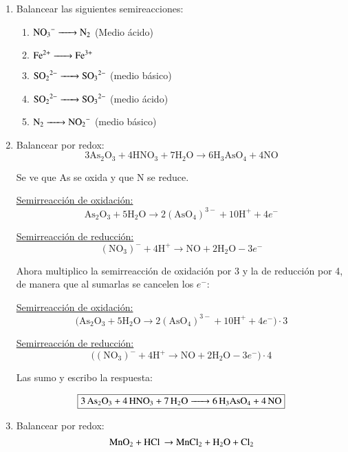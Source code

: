 \begin{enumerate}

\item Balancear las siguientes semireacciones:
\begin{enumerate}
    \item $\ce{ NO_3^- -> N_2 }$ (Medio ácido)
    \item $\ce{ Fe^{2+} -> Fe^{3+} }$
    \item $\ce{ SO_2^{\;2-} -> SO_3^{\;2-} }$ (medio básico)
    \item $\ce{ SO_2^{\;2-} -> SO_3^{\;2-} }$ (medio ácido)
    \item $\ce{ N_2 -> NO_2^- }$ (medio básico)
\end{enumerate}


\item Balancear por redox:
$$3\text{As}_2\text{O}_3 + 4\text{HNO}_3 + 7\text{H}_2\text{O} \rightarrow
6\text{H}_3 \text{AsO}_4 + 4\text{NO}$$

Se ve que As se oxida y que N se reduce.

\begin{multicols}{2}

\underline{Semirreacción de oxidación:}
$$\text{As}_2\text{O}_3 + 5\text{H}_2\text{O}\longrightarrow
2(\text{AsO}_4)^{3-} + 10\text{H}^+ + 4e^-$$

\underline{Semirreacción de reducción:}
$$(\text{NO}_3)^{-} + 4 \text{H}^+ \longrightarrow
\text{NO} + 2\text{H}_2\text{O} - 3e^-$$
\end{multicols}

Ahora multiplico la semirreacción de oxidación por 3 y la de reducción por 4, de manera que al sumarlas se cancelen los $e^-$:

\begin{multicols}{2}

\underline{Semirreacción de oxidación:}
$$\big(\text{As}_2\text{O}_3 + 5\text{H}_2\text{O}\longrightarrow
2(\text{AsO}_4)^{3-} + 10\text{H}^+ + 4e^-\big) \cdot 3$$

\underline{Semirreacción de reducción:}
$$\big((\text{NO}_3)^{-} + 4 \text{H}^+ \longrightarrow
\text{NO} + 2\text{H}_2\text{O} - 3e^-\big) \cdot 4$$
\end{multicols}

\noindent
Las sumo y escribo la respuesta:

$$\fbox{\ce{3As_2O_3 + 4HNO_3 + 7H_2O -> 6H_3AsO_4 + 4NO}}$$


\item Balancear por redox:
$$\ce{MnO_2 + HCl \rightarrow MnCl_2 + H_2O + Cl_2}$$


\end{enumerate}
